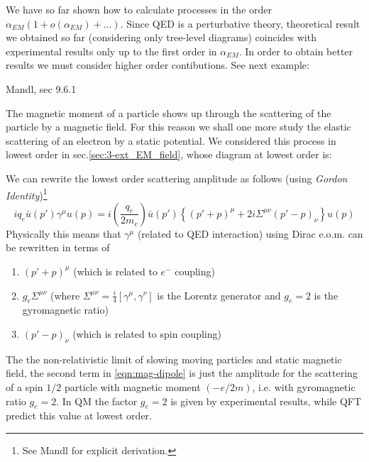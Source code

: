 \documentclass[TheoreticalPhy_ModB.tex]{subfiles}
\begin{document}
We have so far shown how to calculate processes in the order $\alpha_{EM}(1+o(\alpha_{EM})+\dots)$.
Since QED is a perturbative theory, theoretical result we obtained so far (considering only tree-level diagrams) coincides with experimental results only up to the first order in $\alpha_{EM}$. In order to obtain better results we must consider higher order contibutions. See next example:

\begin{example}
\textsf{Mandl, sec 9.6.1}

The magnetic moment of a particle shows up through the scattering of the particle by a magnetic field. For this reason we shall one more study the elastic scattering of an electron by a static potential. We considered this process in lowest order in sec.\ref{sec:3-ext_EM_field}, whose diagram at lowest order is:
\onlyinsubfile{\begin{comment}}
\begin{figure}[H]
\centering
{}
\end{figure}
\onlyinsubfile{\end{comment}}

We can rewrite the lowest order scattering amplitude as follows (using \emph{Gordon Identity})\footnote{See Mandl for explicit derivation.}
\begin{equation}\label{eqn:mag-dipole}
iq_e\bar u(p')\gamma^\mu u(p)=i\left(\frac{q_e}{2m_e}\right)\bar u(p')\left\{(p'+p)^\mu+2i\Sigma^{\mu\nu}(p'-p)_\nu\right\}u(p)
\end{equation}
Physically this means that $\gamma^\mu$ (related to QED interaction) using Dirac e.o.m. can be rewritten in terms of 
\begin{enumerate}
\item $(p'+p)^\mu$ (which is related to $e^-$ coupling)
\item $g_e\Sigma^{\mu\nu}$ (where $\Sigma^{\mu\nu}=\frac i4[\gamma^\mu,\gamma^\nu]$ is the Lorentz generator and $g_e=2$ is the gyromagnetic ratio)
\item $(p'-p)_\nu$ (which is related to spin coupling)
\end{enumerate}
The the non-relativistic limit of slowing moving particles and static magnetic field, the second term in \eqref{eqn:mag-dipole} is just the amplitude for the scattering of a spin $1/2$ particle with magnetic moment $(-e/2m)$, i.e. with gyromagnetic ratio $g_e=2$. In QM the factor $g_e=2$ is given by experimental results, while QFT predict this value at lowest order.


\end{example}
\end{document}
